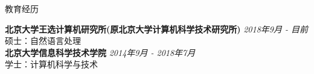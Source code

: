 \documentclass{resume} %
\begin{document}











\begin{rSection}{教育经历}

    {\bf 北京大学王选计算机研究所(原北京大学计算机科学技术研究所)} \hfill {\em 2018年9月 - 目前} 
    \\ 硕士：自然语言处理 \\
    {\bf 北京大学信息科学技术学院} \hfill {\em 2014年9月 - 2018年7月}
    \\ 学士：计算机科学与技术
 
\end{rSection}
    
\end{document}
